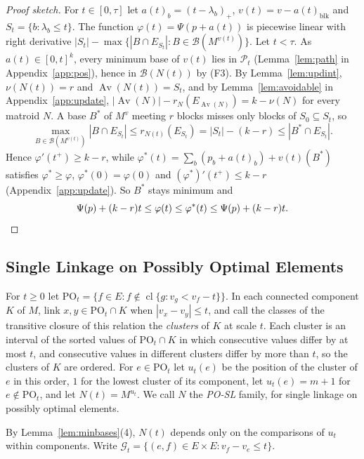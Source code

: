 \documentclass[runningheads,envcountsame]{llncs}
\newcommand{\cl}{\operatorname{cl}}
\newcommand{\blk}{\operatorname{blk}}
\newcommand{\PO}{\mathrm{PO}}
\newcommand{\Bases}{\mathcal B}
\newcommand{\Pos}{\mathcal P}
\newcommand{\Av}{\operatorname{Av}}
\begin{document}
\begin{proof}[Proof sketch]
For $t\in[0,\tau]$ let $a(t)_b=(t-\lambda_b)_+$, $v(t)=v-a(t)_{\blk}$ and
$S_t=\{b:\lambda_b\le t\}$.  The function $\varphi(t)=\Psi(p+a(t))$ is piecewise
linear with right derivative
$|S_t|-\max\{|B\cap E_{S_t}|:B\in\Bases(M^{v(t)})\}$.  Let $t<\tau$.  As
$a(t)\in[0,t]^{k}$, every minimum base of $v(t)$ lies in $\Pos_t$
(Lemma~\ref{lem:path} in Appendix~\ref{app:pos}), hence in $\Bases(N(t))$ by
(F3).  By Lemma~\ref{lem:updint}, $\nu(N(t))=r$ and $\Av(N(t))=S_t$, and by
Lemma~\ref{lem:avoidable} in Appendix~\ref{app:update},
$|\Av(N)|-r_N(E_{\Av(N)})=k-\nu(N)$ for every matroid $N$.  A base $B^{*}$ of
$M^{v}$ meeting $r$ blocks misses only blocks of $S_0\subseteq S_t$, so
\[
  \max_{B\in\Bases(M^{v(t)})}|B\cap E_{S_t}|\le r_{N(t)}(E_{S_t})=|S_t|-(k-r)
  \le|B^{*}\cap E_{S_t}|.
\]
Hence $\varphi'(t^{+})\ge k-r$, while $\varphi^{*}(t)=\sum_b(p_b+a(t)_b)+v(t)(B^{*})$
satisfies $\varphi^{*}\ge\varphi$, $\varphi^{*}(0)=\varphi(0)$ and
$(\varphi^{*})'(t^{+})\le k-r$ (Appendix~\ref{app:update}).  So $B^{*}$ stays
minimum and
\[
  \Psi(p)+(k-r)t\le\varphi(t)\le\varphi^{*}(t)\le\Psi(p)+(k-r)t.\qedhere
\]
\end{proof}

\subsection{Single Linkage on Possibly Optimal Elements}
\label{sec:posl}

\begin{definition}
\label{def:posl}
For $t\ge0$ let $\PO_t=\bigl\{f\in E:f\notin\cl\{g:v_g<v_f-t\}\bigr\}$.  In each
connected component $K$ of $M$, link $x,y\in\PO_t\cap K$ when $|v_x-v_y|\le t$,
and call the classes of the transitive closure of this relation the
\emph{clusters} of $K$ at scale $t$.  Each cluster is an interval of the sorted
values of $\PO_t\cap K$ in which consecutive values differ by at most $t$, and
consecutive values in different clusters differ by more than $t$, so the clusters
of $K$ are ordered.  For $e\in\PO_t$ let $u_t(e)$ be the position of the cluster
of $e$ in this order, $1$ for the lowest cluster of its component, let
$u_t(e)=m+1$ for $e\notin\PO_t$, and let $N(t)=M^{u_t}$.  We call $N$ the
\emph{PO-SL} family, for single linkage on possibly optimal elements.
\end{definition}

By Lemma~\ref{lem:minbases}(4), $N(t)$ depends only on the comparisons of $u_t$
within components.  Write $\mathcal G_t=\{(e,f)\in E\times E:v_f-v_e\le t\}$.
\end{document}
